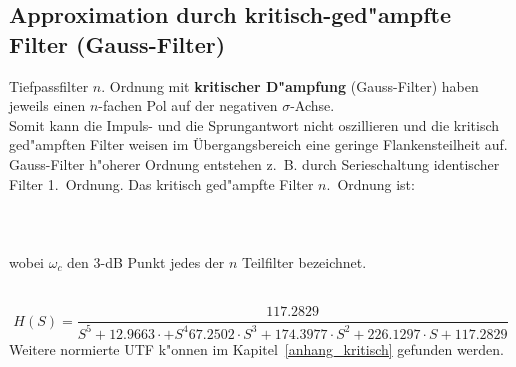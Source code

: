 \subsection{Approximation durch kritisch-ged"ampfte Filter (Gauss-Filter)}
Tiefpassfilter $n$. Ordnung mit  {\bf kritischer D"ampfung} (Gauss-Filter) haben jeweils einen $n$-fachen Pol auf der negativen $\sigma$-Achse.\\ \nit Somit kann die Impuls- und die Sprungantwort nicht oszillieren und die kritisch ged"ampften Filter weisen im \"Ubergangsbereich eine geringe Flankensteilheit auf.\\ \nit Gauss-Filter h"oherer Ordnung entstehen z.~B. durch Serieschaltung identischer Filter 1.~Ordnung. Das kritisch ged"ampfte Filter $n$.~Ordnung ist:~\\~\\
~\\~\\
wobei $\omega_c$ den 3-dB Punkt jedes der $n$ Teilfilter bezeichnet. 
~\\
~\\ 

\begin{equation*}
H(S)=\frac{117.2829}{S^5+12.9663\cdot+ S^4   67.2502\cdot S^3 +  174.3977\cdot S^2 +  226.1297\cdot S +  117.2829}
\end{equation*}
Weitere normierte UTF k"onnen im Kapitel~\ref{anhang_kritisch} gefunden werden.

